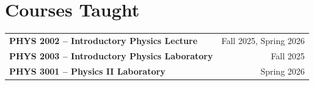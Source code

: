 \section{Courses Taught}

\begin{tabularx}{\linewidth}{@{}Xr@{}}
\textbf{PHYS 2002 -- Introductory Physics Lecture}
  & Fall 2025, Spring 2026 \\[2pt]

\textbf{PHYS 2003 -- Introductory Physics Laboratory}
  & Fall 2025 \\[2pt]

\textbf{PHYS 3001 -- Physics II Laboratory}
  & Spring 2026
\end{tabularx}
